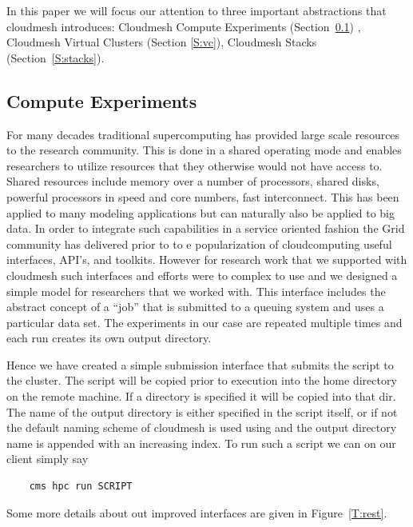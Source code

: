 In this paper we will focus our attention to three important
abstractions that cloudmesh introduces: Cloudmesh Compute Experiments
(Section~\ref{S:experiments}) , Cloudmesh Virtual Clusters (Section
\ref{S:vc}), Cloudmesh Stacks (Section~\ref{S:stacks}).

\subsection{Compute Experiments} \label{S:experiments}

For many decades traditional supercomputing has provided large scale
resources to the research community. This is done in a shared
operating mode and enables researchers to utilize resources that they
otherwise would not have access to. Shared resources include
memory over a number of processors, shared disks, powerful processors
in speed and core numbers, fast interconnect. This has been applied to
many modeling applications but can naturally also be applied to big
data. In order to integrate such capabilities in a service oriented
fashion the Grid community has delivered prior to to e popularization
of cloudcomputing useful interfaces, API's, and toolkits. However for
research work that we supported with cloudmesh such interfaces and
efforts were to complex to use and we designed a simple model for
researchers that we worked with. This interface includes the abstract
concept of a ``job'' that is submitted to a queuing system and uses a
particular data set. The experiments in our case are repeated multiple
times and each run creates its own output directory.

Hence we have created a simple submission interface that submits the
script to the cluster. The script will be copied prior to execution
into the home directory on the remote machine. If a directory is
specified it will be copied into that dir.  The name of the output
directory is either specified in the script itself, or if not the
default naming scheme of cloudmesh is used using and the output
directory name is appended with an increasing index. To run such a
script we can on our client simply say
 
\begin{Verbatim}
    cms hpc run SCRIPT
\end{Verbatim}

Some more details about out improved interfaces are given in
Figure~\ref{T:rest}.

